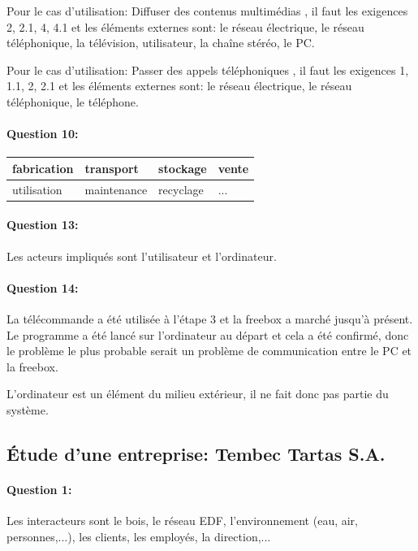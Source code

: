 Pour le cas d'utilisation: \og Diffuser des contenus multimédias \fg, il faut les exigences 2, 2.1, 4, 4.1 et les éléments externes sont: le réseau électrique, le réseau téléphonique, la télévision, utilisateur, la chaîne stéréo, le PC.

Pour le cas d'utilisation: \og Passer des appels téléphoniques \fg, il faut les exigences 1, 1.1, 2, 2.1 et les éléments externes sont: le réseau électrique, le réseau téléphonique, le téléphone.

\paragraph{Question 10:}

\begin{center}
 \begin{tabular}{|l|l|l|l|}
 \hline
 fabrication & transport & stockage & vente \\
 \hline
 utilisation & maintenance & recyclage & ... \\
 \hline
 \end{tabular}
\end{center}

\paragraph{Question 13:} Les acteurs impliqués sont l'utilisateur et l'ordinateur.

\paragraph{Question 14:} La télécommande a été utilisée à l'étape 3 et la freebox a marché jusqu'à présent. Le programme a été lancé sur l'ordinateur au départ et cela a été confirmé, donc le problème le plus probable serait un problème de communication entre le PC et la freebox.

L'ordinateur est un élément du milieu extérieur, il ne fait donc pas partie du système.

\subsection{Étude d'une entreprise: Tembec Tartas S.A.}

\paragraph{Question 1:} Les interacteurs sont le bois, le réseau EDF, l'environnement (eau, air, personnes,...), les clients, les employés, la direction,...

